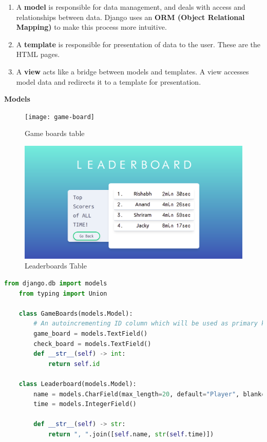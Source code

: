 \documentclass[12pt, a4paper]{report}
\begin{document}
    \begin{enumerate}
        \item A \textbf{model} is responsible for data management, and deals with access and relationships between data. Django uses an \textbf{ORM (Object Relational Mapping)} to make this process more intuitive.
        \item A \textbf{template} is responsible for presentation of data to the user. These are the HTML pages.
        \item A \textbf{view} acts like a bridge between models and templates. A view accesses model data and redirects it to a template for presentation.
    \end{enumerate}
    \textbf{Models}
    \begin{figure}[h!]
        \centering
        \texttt{[image: game-board]}
        \caption{Game boards table}
        \label{fig:game-boards}
    \end{figure}
    \begin{figure}[h!]
        \centering
        \includegraphics{leaderboard}
        \caption{Leaderboards Table}
        \label{fig:leaderboard}
    \end{figure}
    \newpage
    \begin{lstlisting}[language=Python, caption=mainapp/models.py]
    from django.db import models
    from typing import Union

    class GameBoards(models.Model):
        # An autoincrementing ID column which will be used as primary key is automatically added.
        game_board = models.TextField()
        check_board = models.TextField()
        def __str__(self) -> int:
            return self.id
    
    class Leaderboard(models.Model):
        name = models.CharField(max_length=20, default="Player", blank=False)
        time = models.IntegerField()
    
        def __str__(self) -> str: 
            return ", ".join([self.name, str(self.time)])
    \end{lstlisting}
\end{document}
